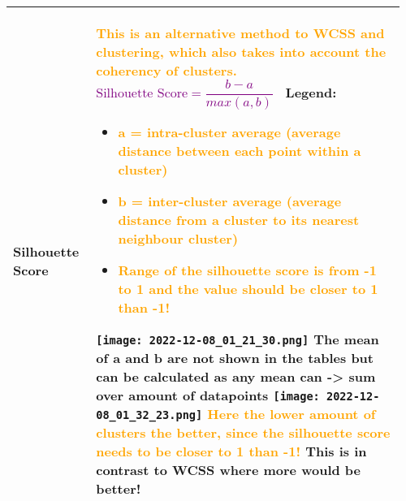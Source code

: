 \documentclass[main.tex,fontsize=8pt,paper=a4,paper=portrait,DIV=calc,]{scrartcl}
\begin{document}
\begin{table}[ht!]
\begin{tabular}{|m{0.2\linewidth}|m{0.755\linewidth}|}
\hline
Silhouette Score & 
\textcolor{orange}{This is an alternative method to WCSS and clustering, which also takes into account the coherency of clusters.}\newline
\, \newline
\large \textcolor{purple}{\( \text{Silhouette Score} = \dfrac{b - a}{max(a,b)}\)}\newline
\normalsize \, \newline
Legend: \newline
\begin{itemize}
\item \textcolor{orange}{a = intra-cluster average (average distance between each point within a cluster)}
\item \textcolor{orange}{b = inter-cluster average (average distance from a cluster to its nearest neighbour cluster)}
\item \textcolor{orange}{Range of the silhouette score is from -1 to 1 and the value should be closer to 1 than -1!}
\end{itemize} 
\texttt{[image: 2022-12-08\_01\_21\_30.png]}\newline
The mean of a and b are not shown in the tables but can be calculated as any mean can -> sum over amount of datapoints\newline
\texttt{[image: 2022-12-08\_01\_32\_23.png]}\newline
\textcolor{orange}{Here the lower amount of clusters the better, since the silhouette score needs to be closer to 1 than -1!}\newline
This is in contrast to WCSS where more would be better!
\\
\hline
\end{tabular}

\end{table}
\end{document}
